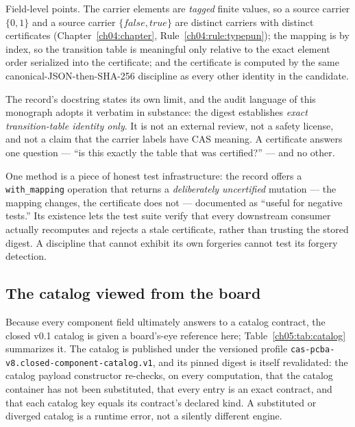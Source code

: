 Field-level points. The carrier elements are \emph{tagged} finite values,
so a source carrier $\{0, 1\}$ and a source carrier
$\{\mathit{false}, \mathit{true}\}$ are distinct carriers with distinct
certificates (Chapter~\ref{ch04:chapter},
Rule~\ref{ch04:rule:typepun}); the mapping is by index, so the
transition table is meaningful only relative to the exact element order
serialized into the certificate; and the certificate is computed by the
same canonical-JSON-then-SHA-256 discipline as every other identity in
the candidate.

The record's docstring states its own limit, and the audit language of
this monograph adopts it verbatim in substance: the digest establishes
\emph{exact transition-table identity only}. It is not an external
review, not a safety license, and not a claim that the carrier labels
have CAS meaning. A certificate answers one question --- ``is this
exactly the table that was certified?'' --- and no other.

One method is a piece of honest test
infrastructure: the record offers a \texttt{with\_mapping} operation
that returns a \emph{deliberately uncertified} mutation --- the mapping
changes, the certificate does not --- documented as ``useful for negative
tests.'' Its existence lets the test suite verify that every downstream
consumer actually recomputes and rejects a stale certificate, rather than
trusting the stored digest. A discipline that cannot exhibit its own
forgeries cannot test its forgery detection.

\subsection{The catalog viewed from the board}\label{ch05:sec:catalog}

Because every component field ultimately answers to a catalog contract,
the closed v0.1 catalog is given a board's-eye reference here;
Table~\ref{ch05:tab:catalog} summarizes it. The catalog is published
under the versioned profile
\texttt{cas-pcba-v8.closed-component-catalog.v1}, and its pinned digest
is itself revalidated: the catalog payload constructor re-checks, on
every computation, that the catalog container has not been substituted,
that every entry is an exact contract, and that each catalog key equals
its contract's declared kind. A substituted or diverged catalog is a
runtime error, not a silently different engine.

